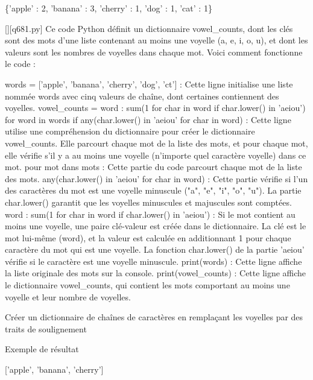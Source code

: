 \{'apple' : 2, 'banana' : 3, 'cherry' : 1, 'dog' : 1, 'cat' : 1\}
        \par
        \begin{solution}
            \renewcommand{\nomfichier}{q681.py}
            \pythonfile{\chemincode \nomfichier}[][\nomfichier]
            Ce code Python définit un dictionnaire vowel_counts, dont les clés sont des mots d'une liste contenant au moins une voyelle (a, e, i, o, u), et dont les valeurs sont les nombres de voyelles dans chaque mot. Voici comment fonctionne le code :

    words = ['apple', 'banana', 'cherry', 'dog', 'ct'] : Cette ligne initialise une liste nommée words avec cinq valeurs de chaîne, dont certaines contiennent des voyelles.
    vowel_counts = {word : sum(1 for char in word if char.lower() in 'aeiou') for word in words if any(char.lower() in 'aeiou' for char in word)} : Cette ligne utilise une compréhension du dictionnaire pour créer le dictionnaire vowel_counts. Elle parcourt chaque mot de la liste des mots, et pour chaque mot, elle vérifie s'il y a au moins une voyelle (n'importe quel caractère voyelle) dans ce mot.
        pour mot dans mots : Cette partie du code parcourt chaque mot de la liste des mots.
        any(char.lower() in 'aeiou' for char in word) : Cette partie vérifie si l'un des caractères du mot est une voyelle minuscule ("a", "e", "i", "o", "u"). La partie char.lower() garantit que les voyelles minuscules et majuscules sont comptées.
        word : sum(1 for char in word if char.lower() in 'aeiou') : Si le mot contient au moins une voyelle, une paire clé-valeur est créée dans le dictionnaire. La clé est le mot lui-même (word), et la valeur est calculée en additionnant 1 pour chaque caractère du mot qui est une voyelle. La fonction char.lower() de la partie 'aeiou' vérifie si le caractère est une voyelle minuscule.
    print(words) : Cette ligne affiche la liste originale des mots sur la console.
    print(vowel_counts) : Cette ligne affiche le dictionnaire vowel_counts, qui contient les mots comportant au moins une voyelle et leur nombre de voyelles.
        \end{solution}
        

        \question
        Créer un dictionnaire de chaînes de caractères en remplaçant les voyelles par des traits de soulignement

Exemple de résultat

['apple', 'banana', 'cherry']

